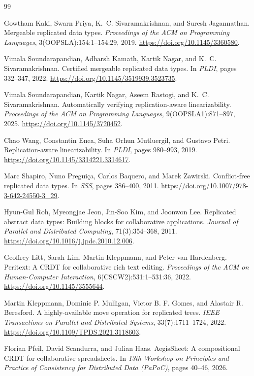 \begin{thebibliography}{99}

Gowtham Kaki, Swarn Priya, K.~C. Sivaramakrishnan, and Suresh Jagannathan.
\newblock Mergeable replicated data types.
\newblock \emph{Proceedings of the ACM on Programming Languages},
3(OOPSLA):154:1--154:29, 2019.
\newblock \url{https://doi.org/10.1145/3360580}.

Vimala Soundarapandian, Adharsh Kamath, Kartik Nagar, and
K.~C. Sivaramakrishnan.
\newblock Certified mergeable replicated data types.
\newblock In \emph{PLDI}, pages 332--347, 2022.
\newblock \url{https://doi.org/10.1145/3519939.3523735}.

Vimala Soundarapandian, Kartik Nagar, Aseem Rastogi, and
K.~C. Sivaramakrishnan.
\newblock Automatically verifying replication-aware linearizability.
\newblock \emph{Proceedings of the ACM on Programming Languages},
9(OOPSLA1):871--897, 2025.
\newblock \url{https://doi.org/10.1145/3720452}.

Chao Wang, Constantin Enea, Suha Orhun Mutluergil, and Gustavo Petri.
\newblock Replication-aware linearizability.
\newblock In \emph{PLDI}, pages 980--993, 2019.
\newblock \url{https://doi.org/10.1145/3314221.3314617}.

Marc Shapiro, Nuno Pregui\c{c}a, Carlos Baquero, and Marek Zawirski.
\newblock Conflict-free replicated data types.
\newblock In \emph{SSS}, pages 386--400, 2011.
\newblock \url{https://doi.org/10.1007/978-3-642-24550-3_29}.

Hyun-Gul Roh, Myeongjae Jeon, Jin-Soo Kim, and Joonwon Lee.
\newblock Replicated abstract data types: Building blocks for collaborative
applications.
\newblock \emph{Journal of Parallel and Distributed Computing},
71(3):354--368, 2011.
\newblock \url{https://doi.org/10.1016/j.jpdc.2010.12.006}.

Geoffrey Litt, Sarah Lim, Martin Kleppmann, and Peter van Hardenberg.
\newblock Peritext: A CRDT for collaborative rich text editing.
\newblock \emph{Proceedings of the ACM on Human-Computer Interaction},
6(CSCW2):531:1--531:36, 2022.
\newblock \url{https://doi.org/10.1145/3555644}.

Martin Kleppmann, Dominic P. Mulligan, Victor B. F. Gomes, and
Alastair R. Beresford.
\newblock A highly-available move operation for replicated trees.
\newblock \emph{IEEE Transactions on Parallel and Distributed Systems},
33(7):1711--1724, 2022.
\newblock \url{https://doi.org/10.1109/TPDS.2021.3118603}.

Florian Pfeil, David Scandurra, and Julian Haas.
\newblock AegisSheet: A compositional CRDT for collaborative spreadsheets.
\newblock In \emph{13th Workshop on Principles and Practice of Consistency for
Distributed Data (PaPoC)}, pages 40--46, 2026.

\end{thebibliography}



